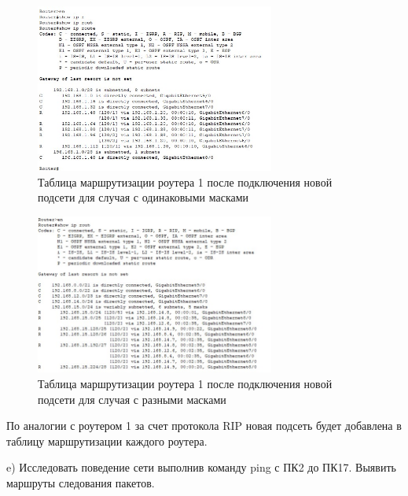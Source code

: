 \documentclass[bachelor, och, labwork]{shiza}
\begin{document}
\begin{enumerate}
    \begin{figure}[H]
        \centering      %
        \includegraphics[width=0.7\textwidth]{6}
        \caption{Таблица маршрутизации роутера 1 после подключения новой подсети для случая с одинаковыми масками}
        \label{fig:image1}
    \end{figure}

    \begin{figure}[H]
        \centering      %
        \includegraphics[width=0.7\textwidth]{8}
        \caption{Таблица маршрутизации роутера 1 после подключения новой подсети для случая с разными масками}
        \label{fig:image1}
    \end{figure}

    По аналогии с роутером 1 за счет протокола RIP новая подсеть будет добавлена в таблицу маршрутизации каждого роутера.

    e) Исследовать поведение сети выполнив команду ping с ПК2 до ПК17. Выявить маршруты следования пакетов.


\end{enumerate}
\end{document}
